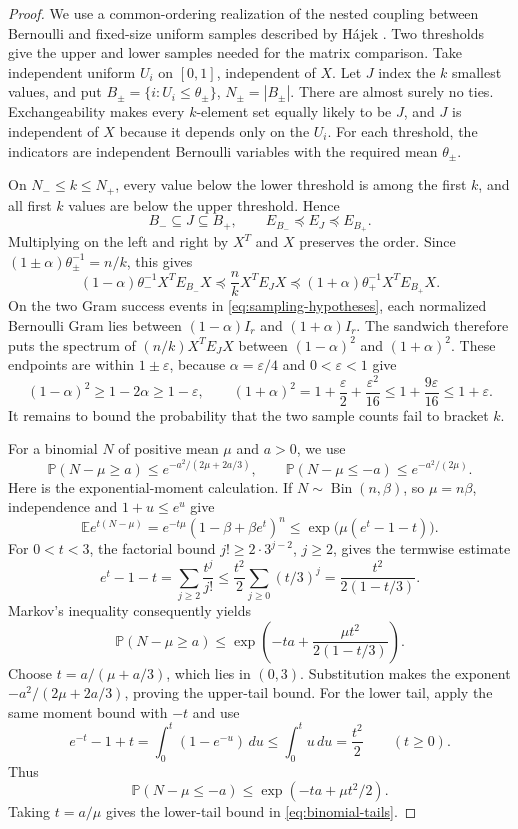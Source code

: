 \documentclass[11pt]{article}
\theoremstyle{definition}
\theoremstyle{remark}
\theoremstyle{plain}
\newcommand{\E}{\mathbb E}
\newcommand{\Prob}{\mathbb P}
\begin{document}
\begin{proof}
We use a common-ordering realization of the nested coupling between
Bernoulli and fixed-size uniform samples described by H\'ajek
\cite[Section~2, pp.~362--363]{hajek_sampling}.
Two thresholds give the upper and lower samples needed for the
matrix comparison.
Take independent uniform \(U_i\) on \([0,1]\), independent of \(X\).
Let \(J\) index the \(k\) smallest values, and put
\(B_\pm=\{i:U_i\le\theta_\pm\}\), \(N_\pm=|B_\pm|\).
There are almost surely no ties. Exchangeability makes every
$k$-element set equally likely to be $J$, and $J$ is independent
of $X$ because it depends only on the $U_i$. For each threshold,
the indicators are independent Bernoulli variables with the required
mean $\theta_\pm$.

On $N_-\le k\le N_+$, every value below the lower threshold is
among the first $k$, and all first $k$ values are below the upper
threshold. Hence
\[
 B_-\subseteq J\subseteq B_+,
 \qquad E_{B_-}\preceq E_J\preceq E_{B_+}.
\]
Multiplying on the left and right by $X^T$ and $X$ preserves the
order. Since $(1\pm\alpha)\theta_\pm^{-1}=n/k$, this gives
\[
 (1-\alpha)\theta_-^{-1}X^TE_{B_-}X
 \preceq \frac nkX^TE_JX
 \preceq (1+\alpha)\theta_+^{-1}X^TE_{B_+}X.
\]
On the two Gram success events in \eqref{eq:sampling-hypotheses},
each normalized Bernoulli Gram lies between
$(1-\alpha)I_r$ and $(1+\alpha)I_r$. The sandwich therefore puts
the spectrum of $(n/k)X^TE_JX$ between
\((1-\alpha)^2\) and \((1+\alpha)^2\). These endpoints are within
$1\pm\varepsilon$, because $\alpha=\varepsilon/4$ and
$0<\varepsilon<1$ give
\[
 (1-\alpha)^2\ge1-2\alpha\ge1-\varepsilon,
 \qquad
 (1+\alpha)^2=1+\frac\varepsilon2+\frac{\varepsilon^2}{16}
                   \le1+\frac{9\varepsilon}{16}\le1+\varepsilon.
\]
It remains to bound the probability that the two sample counts
fail to bracket $k$.

For a binomial \(N\) of positive mean \(\mu\) and $a>0$, we use
\begin{equation}\label{eq:binomial-tails}
 \Prob(N-\mu\ge a)\le e^{-a^2/(2\mu+2a/3)},\qquad
 \Prob(N-\mu\le-a)\le e^{-a^2/(2\mu)}.
\end{equation}
Here is the exponential-moment calculation. If
$N\sim\operatorname{Bin}(n,\beta)$, so $\mu=n\beta$, independence
and $1+u\le e^u$ give
\[
 \E e^{t(N-\mu)}
   =e^{-t\mu}(1-\beta+\beta e^t)^n
   \le\exp\bigl(\mu(e^t-1-t)\bigr).
\]
For $0<t<3$, the factorial bound $j!\ge2\cdot3^{j-2}$,
$j\ge2$, gives the termwise estimate
\[
 e^t-1-t=\sum_{j\ge2}\frac{t^j}{j!}
       \le\frac{t^2}{2}\sum_{j\ge0}(t/3)^j
       =\frac{t^2}{2(1-t/3)}.
\]
Markov's inequality consequently yields
\[
 \Prob(N-\mu\ge a)
   \le\exp\left(-ta+\frac{\mu t^2}{2(1-t/3)}\right).
\]
Choose $t=a/(\mu+a/3)$, which lies in $(0,3)$. Substitution makes
the exponent $-a^2/(2\mu+2a/3)$, proving the upper-tail bound.
For the lower tail, apply the same moment bound with $-t$ and use
\[
 e^{-t}-1+t=\int_0^t(1-e^{-u})\,du
          \le\int_0^t u\,du=\frac{t^2}{2}\qquad(t\ge0).
\]
Thus
\[
 \Prob(N-\mu\le-a)\le\exp(-ta+\mu t^2/2).
\]
Taking $t=a/\mu$ gives the lower-tail bound in
\eqref{eq:binomial-tails}.


\end{proof}
\end{document}
